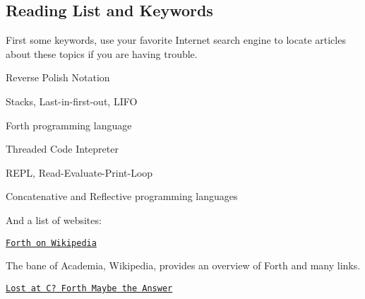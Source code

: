 \subsection*{Reading List and Keywords}

First some keywords, use your favorite Internet search engine to locate articles about these topics if you are having trouble.


\begin{DoxyItemize}
\item Reverse Polish Notation
\end{DoxyItemize}


\begin{DoxyItemize}
\item Stacks, Last-\/in-\/first-\/out, L\-I\-F\-O
\end{DoxyItemize}


\begin{DoxyItemize}
\item Forth programming language
\end{DoxyItemize}


\begin{DoxyItemize}
\item Threaded Code Intepreter
\end{DoxyItemize}


\begin{DoxyItemize}
\item R\-E\-P\-L, Read-\/\-Evaluate-\/\-Print-\/\-Loop
\end{DoxyItemize}


\begin{DoxyItemize}
\item Concatenative and Reflective programming languages
\end{DoxyItemize}

And a list of websites\-:


\begin{DoxyItemize}
\item \href{https://en.wikipedia.org/wiki/Forth_%28programming_language%29}{\tt Forth on Wikipedia}
\end{DoxyItemize}

The bane of Academia, Wikipedia, provides an overview of Forth and many links.


\begin{DoxyItemize}
\item \href{http://www.forth.org/lost-at-c.html}{\tt Lost at C? Forth Maybe the Answer}
\end{DoxyItemize}

